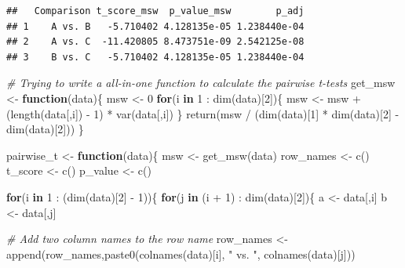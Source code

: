 \documentclass[
]{article}
\newenvironment{Shaded}{\begin{snugshade}}{\end{snugshade}}
\newcommand{\CommentTok}[1]{\textcolor[rgb]{0.56,0.35,0.01}{\textit{#1}}}
\newcommand{\ControlFlowTok}[1]{\textcolor[rgb]{0.13,0.29,0.53}{\textbf{#1}}}
\newcommand{\DecValTok}[1]{\textcolor[rgb]{0.00,0.00,0.81}{#1}}
\newcommand{\FunctionTok}[1]{\textcolor[rgb]{0.00,0.00,0.00}{#1}}
\newcommand{\NormalTok}[1]{#1}
\newcommand{\OtherTok}[1]{\textcolor[rgb]{0.56,0.35,0.01}{#1}}
\newcommand{\SpecialCharTok}[1]{\textcolor[rgb]{0.00,0.00,0.00}{#1}}
\newcommand{\StringTok}[1]{\textcolor[rgb]{0.31,0.60,0.02}{#1}}
\begin{document}
\begin{verbatim}
##   Comparison t_score_msw  p_value_msw        p_adj
## 1    A vs. B   -5.710402 4.128135e-05 1.238440e-04
## 2    A vs. C  -11.420805 8.473751e-09 2.542125e-08
## 3    B vs. C   -5.710402 4.128135e-05 1.238440e-04
\end{verbatim}

\begin{Shaded}
\begin{Highlighting}[]
\CommentTok{\# Trying to write a all{-}in{-}one function to calculate the pairwise t{-}tests}
\NormalTok{get\_msw }\OtherTok{\textless{}{-}} \ControlFlowTok{function}\NormalTok{(data)\{}
\NormalTok{  msw }\OtherTok{\textless{}{-}} \DecValTok{0}
  \ControlFlowTok{for}\NormalTok{(i }\ControlFlowTok{in} \DecValTok{1} \SpecialCharTok{:} \FunctionTok{dim}\NormalTok{(data)[}\DecValTok{2}\NormalTok{])\{}
\NormalTok{    msw }\OtherTok{\textless{}{-}}\NormalTok{ msw }\SpecialCharTok{+}\NormalTok{ (}\FunctionTok{length}\NormalTok{(data[,i]) }\SpecialCharTok{{-}} \DecValTok{1}\NormalTok{) }\SpecialCharTok{*} \FunctionTok{var}\NormalTok{(data[,i])}
\NormalTok{  \}}
  \FunctionTok{return}\NormalTok{(msw }\SpecialCharTok{/}\NormalTok{ (}\FunctionTok{dim}\NormalTok{(data)[}\DecValTok{1}\NormalTok{] }\SpecialCharTok{*} \FunctionTok{dim}\NormalTok{(data)[}\DecValTok{2}\NormalTok{] }\SpecialCharTok{{-}} \FunctionTok{dim}\NormalTok{(data)[}\DecValTok{2}\NormalTok{]))}
\NormalTok{\}}

\NormalTok{pairwise\_t }\OtherTok{\textless{}{-}} \ControlFlowTok{function}\NormalTok{(data)\{}
\NormalTok{  msw }\OtherTok{\textless{}{-}} \FunctionTok{get\_msw}\NormalTok{(data)}
\NormalTok{  row\_names }\OtherTok{\textless{}{-}} \FunctionTok{c}\NormalTok{()}
\NormalTok{  t\_score }\OtherTok{\textless{}{-}} \FunctionTok{c}\NormalTok{()}
\NormalTok{  p\_value }\OtherTok{\textless{}{-}} \FunctionTok{c}\NormalTok{()}
  
  \ControlFlowTok{for}\NormalTok{(i }\ControlFlowTok{in} \DecValTok{1} \SpecialCharTok{:}\NormalTok{ (}\FunctionTok{dim}\NormalTok{(data)[}\DecValTok{2}\NormalTok{] }\SpecialCharTok{{-}} \DecValTok{1}\NormalTok{))\{}
    \ControlFlowTok{for}\NormalTok{(j }\ControlFlowTok{in}\NormalTok{ (i }\SpecialCharTok{+} \DecValTok{1}\NormalTok{) }\SpecialCharTok{:} \FunctionTok{dim}\NormalTok{(data)[}\DecValTok{2}\NormalTok{])\{}
\NormalTok{      a }\OtherTok{\textless{}{-}}\NormalTok{ data[,i]}
\NormalTok{      b }\OtherTok{\textless{}{-}}\NormalTok{ data[,j]}
      
      \CommentTok{\# Add two column names to the row name}
\NormalTok{      row\_names }\OtherTok{\textless{}{-}} \FunctionTok{append}\NormalTok{(row\_names,}\FunctionTok{paste0}\NormalTok{(}\FunctionTok{colnames}\NormalTok{(data)[i], }\StringTok{" vs. "}\NormalTok{, }\FunctionTok{colnames}\NormalTok{(data)[j]))}
      

\end{Highlighting}
\end{Shaded}
\end{document}
